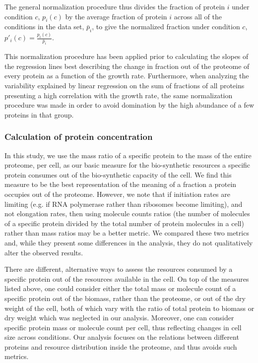 \documentclass{article}
\begin{document}
The general normalization procedure thus divides the fraction of protein $i$ under condition $c$, $p_i(c)$ by the average fraction of protein $i$ across all of the conditions in the data set, $\bar{p}_i$, to give the normalized fraction under condition $c$, $p'_i(c)=\frac{p_i(c)}{\bar{p}_i}$.

This normalization procedure has been applied prior to calculating the slopes of the regression lines best describing the change in fraction out of the proteome of every protein as a function of the growth rate.
Furthermore, when analyzing the variability explained by linear regression on the sum of fractions of all proteins presenting a high correlation with the growth rate, the same normalization procedure was made in order to avoid domination by the high abundance of a few proteins in that group.

\subsubsection{Calculation of protein concentration}
\label{protconc} 

In this study, we use the mass ratio of a specific protein to the mass of the entire proteome, per cell, as our basic measure for the bio-synthetic resources a specific protein consumes out of the bio-synthetic capacity of the cell.
We find this measure to be the best representation of the meaning of a fraction a protein occupies out of the proteome.
However, we note that if initiation rates are limiting (e.g. if RNA polymerase rather than ribosomes become limiting), and not elongation rates, then using molecule counts ratios (the number of molecules of a specific protein divided by the total number of protein molecules in a cell) rather than mass ratios may be a better metric.
We compared these two metrics and, while they present some differences in the analysis, they do not qualitatively alter the observed results.

There are different, alternative ways to assess the resources consumed by a specific protein out of the resources available in the cell.
On top of the measures listed above, one could consider either the total mass or molecule count of a specific protein out of the biomass, rather than the proteome, or out of the dry weight of the cell, both of which vary with the ratio of total protein to biomass or dry weight which was neglected in our analysis.
Moreover, one can consider specific protein mass or molecule count per cell, thus reflecting changes in cell size across conditions.
Our analysis focuses on the relations between different proteins and resource distribution inside the proteome, and thus avoids such metrics.
\end{document}
